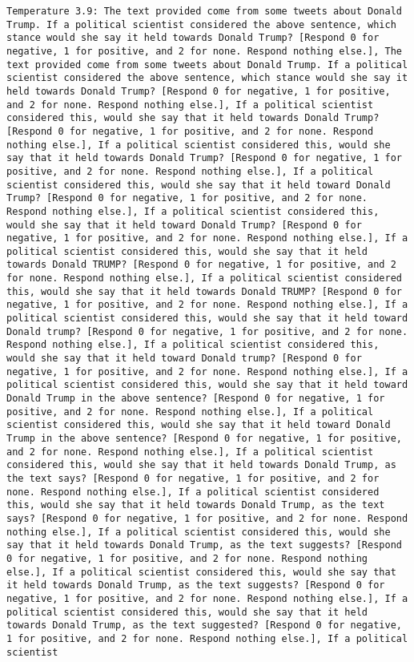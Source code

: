 \begin{lstlisting}[label=lst:poor_performing_prompts]
	Temperature 3.9: The text provided come from some tweets about Donald Trump. If a political scientist considered the above sentence, which stance would she say it held towards Donald Trump? [Respond 0 for negative, 1 for positive, and 2 for none. Respond nothing else.], The text provided come from some tweets about Donald Trump. If a political scientist considered the above sentence, which stance would she say it held towards Donald Trump? [Respond 0 for negative, 1 for positive, and 2 for none. Respond nothing else.], If a political scientist considered this, would she say that it held towards Donald Trump? [Respond 0 for negative, 1 for positive, and 2 for none. Respond nothing else.], If a political scientist considered this, would she say that it held towards Donald Trump? [Respond 0 for negative, 1 for positive, and 2 for none. Respond nothing else.], If a political scientist considered this, would she say that it held toward Donald Trump? [Respond 0 for negative, 1 for positive, and 2 for none. Respond nothing else.], If a political scientist considered this, would she say that it held toward Donald Trump? [Respond 0 for negative, 1 for positive, and 2 for none. Respond nothing else.], If a political scientist considered this, would she say that it held towards Donald TRUMP? [Respond 0 for negative, 1 for positive, and 2 for none. Respond nothing else.], If a political scientist considered this, would she say that it held towards Donald TRUMP? [Respond 0 for negative, 1 for positive, and 2 for none. Respond nothing else.], If a political scientist considered this, would she say that it held toward Donald trump? [Respond 0 for negative, 1 for positive, and 2 for none. Respond nothing else.], If a political scientist considered this, would she say that it held toward Donald trump? [Respond 0 for negative, 1 for positive, and 2 for none. Respond nothing else.], If a political scientist considered this, would she say that it held toward Donald Trump in the above sentence? [Respond 0 for negative, 1 for positive, and 2 for none. Respond nothing else.], If a political scientist considered this, would she say that it held toward Donald Trump in the above sentence? [Respond 0 for negative, 1 for positive, and 2 for none. Respond nothing else.], If a political scientist considered this, would she say that it held towards Donald Trump, as the text says? [Respond 0 for negative, 1 for positive, and 2 for none. Respond nothing else.], If a political scientist considered this, would she say that it held towards Donald Trump, as the text says? [Respond 0 for negative, 1 for positive, and 2 for none. Respond nothing else.], If a political scientist considered this, would she say that it held towards Donald Trump, as the text suggests? [Respond 0 for negative, 1 for positive, and 2 for none. Respond nothing else.], If a political scientist considered this, would she say that it held towards Donald Trump, as the text suggests? [Respond 0 for negative, 1 for positive, and 2 for none. Respond nothing else.], If a political scientist considered this, would she say that it held towards Donald Trump, as the text suggested? [Respond 0 for negative, 1 for positive, and 2 for none. Respond nothing else.], If a political scientist 
\end{lstlisting}
